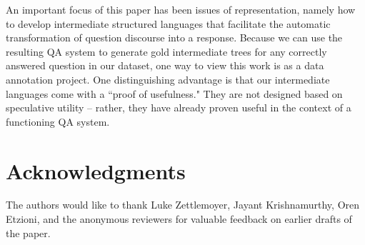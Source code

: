 \documentclass[11pt,letterpaper]{article}
\begin{document}
An important focus of this paper has been issues of representation, namely how to develop intermediate structured languages that facilitate the automatic transformation of question discourse into a response. Because we can use the resulting QA system to generate gold intermediate trees for any correctly answered question in our dataset, one way to view this work is as a data annotation project. One distinguishing advantage is that our intermediate languages come with a ``proof of usefulness." They are not designed based on speculative utility -- rather, they have already proven useful in the context of a functioning QA system.

\section*{Acknowledgments}

The authors would like to thank Luke Zettlemoyer, Jayant Krishnamurthy, Oren Etzioni, and the anonymous reviewers for valuable feedback on earlier drafts of the paper.




\end{document}
